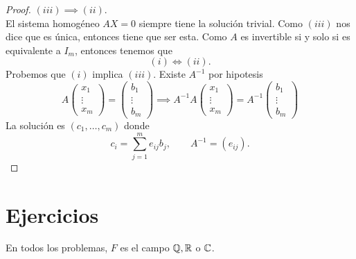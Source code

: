 \documentclass[12pt,a4paper]{book}
\begin{document}
    \begin{proof}
        $(iii)\implies (ii)$.\\
        El sistema homogéneo $AX=0$ siempre tiene la solución trivial. Como $(iii)$ nos
        dice que es única, entonces tiene que ser esta. Como $A$ es invertible si y solo si
        es equivalente a $I_{m}$, entonces tenemos que
        \begin{equation*}
            (i)\Longleftrightarrow(ii).
        \end{equation*}
        Probemos que $(i)$ implica $(iii)$. Existe $A^{-1}$ por hipotesis
        \begin{equation*}
            A
            \begin{pmatrix}
                x_{1}\\
                \vdots\\
                x_{m}
            \end{pmatrix}
            =
            \begin{pmatrix}
                b_{1}\\
                \vdots\\
                b_{m}
            \end{pmatrix}
            \implies A^{-1}A
            \begin{pmatrix}
                x_{1}\\
                \vdots\\
                x_{m}
            \end{pmatrix}
            =A^{-1}
            \begin{pmatrix}
                b_{1}\\
                \vdots\\
                b_{m}
            \end{pmatrix}
        \end{equation*}
        La solución es $(c_{1},\dots,c_{m})$ donde
        \begin{equation*}
            c_{i}=\sum_{j=1}^{m}e_{ij}b_{j},\qquad A^{-1}=(e_{ij}).
        \end{equation*}
    \end{proof}

    \section{Ejercicios}

    En todos los problemas, $F$ es el campo $\mathbb{Q}, \mathbb{R}$ o $\mathbb{C}$.
\end{document}
